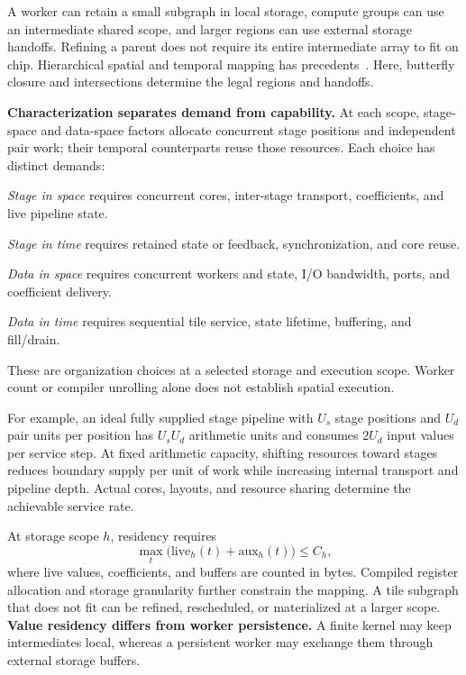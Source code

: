 A worker can retain a small subgraph in local storage, compute groups can use
an intermediate shared scope, and larger regions can use external storage handoffs. Refining a parent
does not require its entire intermediate array to fit on chip. Hierarchical
spatial and temporal mapping has precedents~\cite{timeloop2019}. Here,
butterfly closure and intersections determine the legal regions and handoffs.

\textbf{Characterization separates demand from capability.}
At each scope, stage-space and data-space factors allocate concurrent stage
positions and independent pair work; their temporal counterparts reuse those
resources. Each choice has distinct demands:

\noindent\emph{Stage in space} requires concurrent cores, inter-stage
transport, coefficients, and live pipeline state.\par
\noindent\emph{Stage in time} requires retained state or feedback,
synchronization, and core reuse.\par
\noindent\emph{Data in space} requires concurrent workers and state,
I/O bandwidth, ports, and coefficient delivery.\par
\noindent\emph{Data in time} requires sequential tile service, state
lifetime, buffering, and fill/drain.

These are organization choices at a selected storage and execution scope.
Worker count or compiler unrolling alone does not establish spatial execution.

For example, an ideal fully supplied stage pipeline with $U_s$ stage
positions and $U_d$ pair units per position has $U_sU_d$ arithmetic units
and consumes $2U_d$ input values per service step. At fixed arithmetic
capacity, shifting resources toward stages reduces boundary supply per unit
of work while increasing internal transport and pipeline depth. Actual
cores, layouts, and resource sharing determine the achievable service rate.

At storage scope $h$, residency requires
\begin{equation}
\max_t\bigl(\mathrm{live}_h(t)+\mathrm{aux}_h(t)\bigr)\leq C_h,
\label{eq:capacity}
\end{equation}
where live values, coefficients, and buffers are counted in bytes. Compiled
register allocation and storage granularity further constrain the mapping.
A tile subgraph that does not fit can be refined, rescheduled, or materialized
at a larger scope. \textbf{Value residency differs from worker persistence.}
A finite kernel may keep intermediates local, whereas a persistent worker may
exchange them through external storage buffers.

